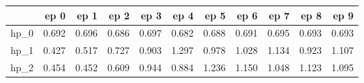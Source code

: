 \begin{tabular}{lrrrrrrrrrr}
\toprule
{} &   ep 0 &   ep 1 &   ep 2 &   ep 3 &   ep 4 &   ep 5 &   ep 6 &   ep 7 &   ep 8 &   ep 9 \\
\midrule
hp\_0 &  0.692 &  0.696 &  0.686 &  0.697 &  0.682 &  0.688 &  0.691 &  0.695 &  0.693 &  0.693 \\
hp\_1 &  0.427 &  0.517 &  0.727 &  0.903 &  1.297 &  0.978 &  1.028 &  1.134 &  0.923 &  1.107 \\
hp\_2 &  0.454 &  0.452 &  0.609 &  0.944 &  0.884 &  1.236 &  1.150 &  1.048 &  1.123 &  1.095 \\
\bottomrule
\end{tabular}
